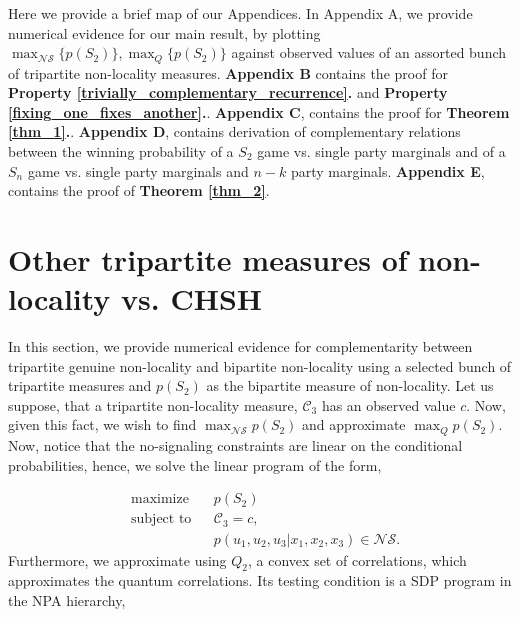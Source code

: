 
\begin{widetext}
\begin{appendices} 



\label{appendix:tables}
Here we provide a brief map of our Appendices. In Appendix A, we provide numerical evidence for our main result, by plotting $\max_{\mathcal{NS}}\{p(S_2)\},\max_{{Q}}\{p(S_2)\}$  against observed values of an assorted bunch of tripartite non-locality measures. \textbf{Appendix B} contains the proof for \textbf{Property \ref{trivially_complementary_recurrence}.}  and \textbf{Property \ref{fixing_one_fixes_another}.}. \textbf{Appendix C}, contains the proof for \textbf{Theorem \ref{thm_1}.}. \textbf{Appendix D}, contains derivation of complementary relations between the winning probability of a $S_2$ game vs. single party marginals and of a $S_n$ game vs. single party marginals and $n-k$ party marginals.  
\textbf{Appendix E}, contains the proof of \textbf{Theorem \ref{thm_2}}.

 




\section{Other tripartite measures of non-locality vs. CHSH}
In this section, we provide numerical evidence for complementarity between tripartite genuine non-locality and bipartite non-locality using a selected bunch of tripartite measures and $p(S_2)$ as the bipartite measure of non-locality. Let us suppose, that a tripartite non-locality measure, $\mathcal{C}_3$ has an observed value $c$. Now, given this fact, we wish to find $\max_{\mathcal{NS}}p(S_2)$ and approximate $\max_{Q}p(S_2)$. Now, notice that the no-signaling constraints are linear on the conditional probabilities, hence, we solve the linear program of the form,

	
\begin{equation*}
\begin{aligned}
& {\text{maximize}}
& & p(S_2) \\
& \text{subject to}
& & \mathcal{C}_3=c, \\
&&& p(u_1,u_2,u_3|x_1,x_2,x_3)\in {\mathcal{NS}}.
\end{aligned}
\end{equation*}
Furthermore, we approximate using $Q_2$, a convex set of correlations, which approximates the quantum correlations. Its testing condition is a SDP program in the NPA hierarchy, 
	

\end{appendices}
\end{widetext}
